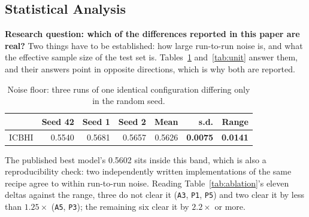 \documentclass[journal,onecolumn]{IEEEtran}
\newcommand{\best}[1]{\textbf{#1}}
\begin{document}
\subsection{Statistical Analysis}
\label{subsec:stats}

\textbf{Research question: which of the differences reported in this paper are
real?} Two things have to be established: how large run-to-run noise is, and what
the effective sample size of the test set is. Tables~\ref{tab:seedband}
and~\ref{tab:unit} answer them, and their answers point in opposite directions,
which is why both are reported.

\begin{table}[!t]
\centering
\caption{Noise floor: three runs of one identical configuration differing only in
the random seed.}
\label{tab:seedband}
\small
\begin{tabular}{lrrrrrr}
\toprule
 & Seed 42 & Seed 1 & Seed 2 & Mean & s.d. & Range \\
\midrule
ICBHI & 0.5540 & 0.5681 & 0.5657 & 0.5626 & \best{0.0075} & \best{0.0141} \\
\bottomrule
\end{tabular}

\vspace{2pt}
\footnotesize The published best model's 0.5602 sits inside this band, which is
also a reproducibility check: two independently written implementations of the
same recipe agree to within run-to-run noise. Reading
Table~\ref{tab:ablation}'s eleven deltas against the range, three do not clear it
(\texttt{A3}, \texttt{P1}, \texttt{P5}) and two clear it by less than $1.25\times$
(\texttt{A5}, \texttt{P3}); the remaining six clear it by $2.2\times$ or more.
\end{table}
\end{document}
